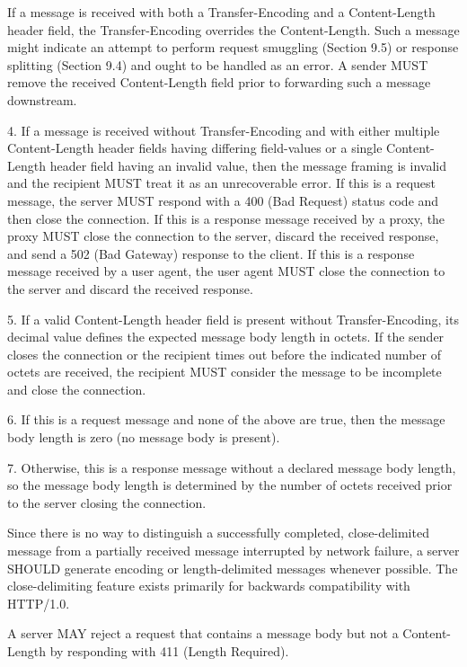     If a message is received with both a Transfer-Encoding and a
    Content-Length header field, the Transfer-Encoding overrides the
    Content-Length.  Such a message might indicate an attempt to
    perform request smuggling (Section 9.5) or response splitting
    (Section 9.4) and ought to be handled as an error.  A sender MUST
    remove the received Content-Length field prior to forwarding such
    a message downstream.

4.  If a message is received without Transfer-Encoding and with
    either multiple Content-Length header fields having differing
    field-values or a single Content-Length header field having an
    invalid value, then the message framing is invalid and the
    recipient MUST treat it as an unrecoverable error.  If this is a
    request message, the server MUST respond with a 400 (Bad Request)
    status code and then close the connection.  If this is a response
    message received by a proxy, the proxy MUST close the connection
    to the server, discard the received response, and send a 502 (Bad
    Gateway) response to the client.  If this is a response message
    received by a user agent, the user agent MUST close the
    connection to the server and discard the received response.

5.  If a valid Content-Length header field is present without
    Transfer-Encoding, its decimal value defines the expected message
    body length in octets.  If the sender closes the connection or
    the recipient times out before the indicated number of octets are
    received, the recipient MUST consider the message to be
    incomplete and close the connection.

6.  If this is a request message and none of the above are true, then
    the message body length is zero (no message body is present).

7.  Otherwise, this is a response message without a declared message
    body length, so the message body length is determined by the
    number of octets received prior to the server closing the
    connection.

Since there is no way to distinguish a successfully completed,
close-delimited message from a partially received message interrupted
by network failure, a server SHOULD generate encoding or
length-delimited messages whenever possible.  The close-delimiting
feature exists primarily for backwards compatibility with HTTP/1.0.

A server MAY reject a request that contains a message body but not a
Content-Length by responding with 411 (Length Required).

